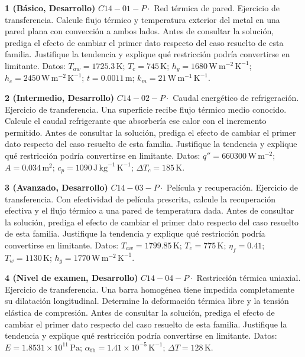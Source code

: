 \documentclass[10pt,openany]{book}
\begin{document}
\begin{tcolorbox}[title={Ejercicios propuestos}, studiumworked, breakable]

\noindent\textbf{1 (Básico, Desarrollo)}
\(C14-01-P \cdot\) Red térmica de pared. Ejercicio de transferencia. Calcule flujo térmico y temperatura exterior del metal en una pared plana con convección a ambos lados. Antes de consultar la solución, prediga el efecto de cambiar el primer dato respecto del caso resuelto de esta familia. Justifique la tendencia y explique qué restricción podría convertirse en limitante. Datos: \(T_{aw}=1725.3\, \mathrm{K}\); \(T_c=745\, \mathrm{K}\); \(h_g=1680\, \mathrm{W}\,\mathrm{m}^{-2}\,\mathrm{K}^{-1}\); \(h_c=2450\, \mathrm{W}\,\mathrm{m}^{-2}\,\mathrm{K}^{-1}\); \(t=0.0011\, \mathrm{m}\); \(k_m=21\, \mathrm{W}\,\mathrm{m}^{-1}\,\mathrm{K}^{-1}\).

\noindent\textbf{2 (Intermedio, Desarrollo)}
\(C14-02-P \cdot\) Caudal energético de refrigeración. Ejercicio de transferencia. Una superficie recibe flujo térmico medio conocido. Calcule el caudal refrigerante que absorbería ese calor con el incremento permitido. Antes de consultar la solución, prediga el efecto de cambiar el primer dato respecto del caso resuelto de esta familia. Justifique la tendencia y explique qué restricción podría convertirse en limitante. Datos: \(q''=660300\, \mathrm{W}\,\mathrm{m}^{-2}\); \(A=0.034\, \mathrm{m}^{2}\); \(c_p=1090\, \mathrm{J}\,\mathrm{kg}^{-1}\,\mathrm{K}^{-1}\); \(\Delta T_c=185\, \mathrm{K}\).

\noindent\textbf{3 (Avanzado, Desarrollo)}
\(C14-03-P \cdot\) Película y recuperación. Ejercicio de transferencia. Con efectividad de película prescrita, calcule la recuperación efectiva y el flujo térmico a una pared de temperatura dada. Antes de consultar la solución, prediga el efecto de cambiar el primer dato respecto del caso resuelto de esta familia. Justifique la tendencia y explique qué restricción podría convertirse en limitante. Datos: \(T_{aw}=1799.85\, \mathrm{K}\); \(T_c=775\, \mathrm{K}\); \(\eta_f=0.41\); \(T_w=1130\, \mathrm{K}\); \(h_g=1770\, \mathrm{W}\,\mathrm{m}^{-2}\,\mathrm{K}^{-1}\).

\noindent\textbf{4 (Nivel de examen, Desarrollo)}
\(C14-04-P \cdot\) Restricción térmica uniaxial. Ejercicio de transferencia. Una barra homogénea tiene impedida completamente su dilatación longitudinal. Determine la deformación térmica libre y la tensión elástica de compresión. Antes de consultar la solución, prediga el efecto de cambiar el primer dato respecto del caso resuelto de esta familia. Justifique la tendencia y explique qué restricción podría convertirse en limitante. Datos: \(E=1.8531\times 10^{11}\, \mathrm{Pa}\); \(\alpha_{\mathrm{th}}=1.41\times 10^{-5}\, \mathrm{K}^{-1}\); \(\Delta T=128\, \mathrm{K}\).
\end{tcolorbox}
\end{document}
